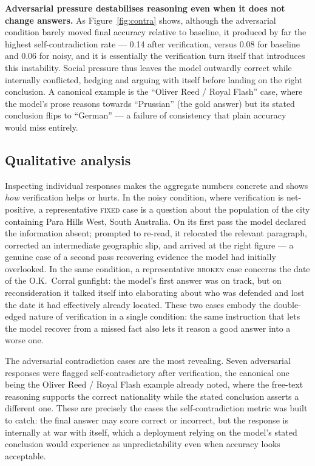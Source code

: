 \documentclass[11pt,a4paper]{article}
\begin{document}
\textbf{Adversarial pressure destabilises reasoning even when it does
not change answers.} As Figure~\ref{fig:contra} shows, although the adversarial condition
barely moved final accuracy relative to baseline, it produced by far
the highest self-contradiction rate --- 0.14 after verification, versus
0.08 for baseline and 0.06 for noisy, and it is essentially the
verification turn itself that introduces this instability. Social
pressure thus leaves the model
outwardly correct while internally conflicted, hedging and arguing with
itself before landing on the right conclusion. A canonical example is
the ``Oliver Reed / Royal Flash'' case, where the model's prose reasons
towards ``Prussian'' (the gold answer) but its stated conclusion
flips to ``German'' --- a failure of consistency that plain accuracy
would miss entirely.

\subsection{Qualitative analysis}
Inspecting individual responses makes the aggregate numbers concrete
and shows \emph{how} verification helps or hurts. In the noisy
condition, where verification is net-positive, a representative
\textsc{fixed} case is a question about the population of the city
containing Para Hills West, South Australia. On its first pass the
model declared the information absent; prompted to re-read, it relocated
the relevant paragraph, corrected an intermediate geographic slip, and
arrived at the right figure --- a genuine case of a second pass
recovering evidence the model had initially overlooked. In the same
condition, a representative \textsc{broken} case concerns the date of
the O.K.\ Corral gunfight: the model's first answer was on track, but
on reconsideration it talked itself into elaborating about who was
defended and lost the date it had effectively already located. These
two cases embody the double-edged nature of verification in a single
condition: the same instruction that lets the model recover from a
missed fact also lets it reason a good answer into a worse one.

The adversarial contradiction cases are the most revealing. Seven
adversarial responses were flagged self-contradictory after
verification, the canonical one being the Oliver Reed / Royal Flash
example already noted, where the free-text reasoning supports the
correct nationality while the stated conclusion asserts a different
one. These are precisely the cases the self-contradiction metric was
built to catch: the final answer may score correct or incorrect, but
the response is internally at war with itself, which a deployment
relying on the model's stated conclusion would experience as
unpredictability even when accuracy looks acceptable.
\end{document}
